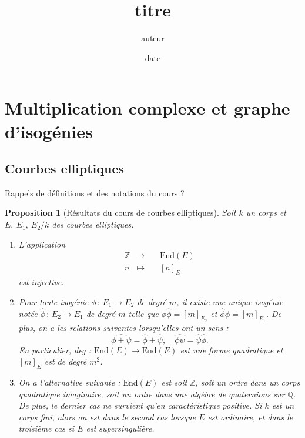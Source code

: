 \documentclass[11pt,a4paper]{article}
\title{titre}
\author{auteur}
\date{date}
\newcommand{\Z}{\mathbb{Z}}
\newcommand{\Q}{\mathbb{Q}}
\newcommand{\vers}{\rightarrow}
\newcommand{\End}{\mathrm{End}}
\newcommand{\de}{\,:\,}
\newtheorem{prop}[thm]{Proposition}
\theoremstyle{definition}
\begin{document}
\maketitle

\newpage

\tableofcontents

\newpage

\section{Multiplication complexe et graphe d'isogénies}

\subsection{Courbes elliptiques}

Rappels de définitions et des notations du cours ?

\begin{prop}[Résultats du cours de courbes elliptiques]
Soit $k$ un corps et $E,\ E_1,\ E_2/k$ des courbes elliptiques. 
\begin{enumerate}

\item L'application
$$\begin{aligned}
&\Z &\longrightarrow&\ &\End(E) &\\
&n &\longmapsto& &[n]_E \ \ &
\end{aligned}$$
est injective.

\item Pour toute isogénie $\phi\de E_1\vers E_2$ de degré $m$, il existe une unique isogénie notée $\widehat{\phi}\de E_2\vers E_1$ de degré $m$ telle que $\phi\widehat{\phi}=[m]_{E_2}$ et $\widehat{\phi}\phi=[m]_{E_1}$.
De plus, on a les relations suivantes lorsqu'elles ont un sens :
$$\widehat{\phi+\psi}=\widehat{\phi}+\widehat{\psi},\quad \widehat{\phi\psi}=\widehat{\psi}\widehat{\phi}.$$
En particulier, deg : $\End(E)\vers \End(E)$ est une forme quadratique et $[m]_E$ est de degré $m^2$.

\item On a l'alternative suivante : $\End(E)$ est soit $\Z$, soit un ordre dans un corps quadratique imaginaire, soit un ordre dans une algèbre de quaternions sur $\Q$. De plus, le dernier cas ne survient qu'en caractéristique positive. Si $k$ est un corps fini, alors on est dans le second cas lorsque $E$ est ordinaire, et dans le troisième cas si $E$ est supersingulière.

\end{enumerate}
\end{prop}
\end{document}
